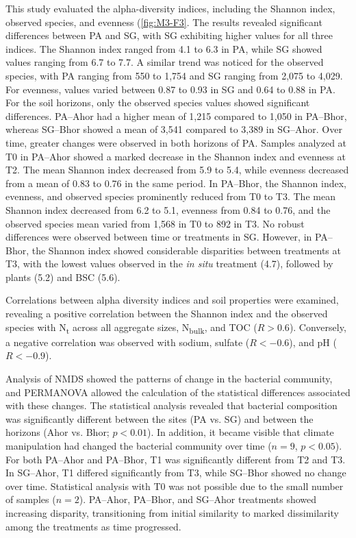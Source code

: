 This study evaluated the alpha-diversity indices, including the Shannon index, observed species, and evenness (\ref{fig:M3-F3}. The results revealed significant differences between PA and SG, with SG exhibiting higher values for all three indices. The Shannon index ranged from 4.1 to 6.3 in PA, while SG showed values ranging from 6.7 to 7.7. A similar trend was noticed for the observed species, with PA ranging from 550 to 1,754 and SG ranging from 2,075 to 4,029. For evenness, values varied between 0.87 to 0.93 in SG and 0.64 to 0.88 in PA. For the soil horizons, only the observed species values showed significant differences. PA--Ahor had a higher mean of 1,215 compared to 1,050 in PA--Bhor, whereas SG--Bhor showed a mean of 3,541 compared to 3,389 in SG--Ahor. Over time, greater changes were observed in both horizons of PA. Samples analyzed at T0 in PA--Ahor showed a marked decrease in the Shannon index and evenness at T2. The mean Shannon index decreased from 5.9 to 5.4, while evenness decreased from a mean of 0.83 to 0.76 in the same period. In PA--Bhor, the Shannon index, evenness, and observed species prominently reduced from T0 to T3. The mean Shannon index decreased from 6.2 to 5.1, evenness from 0.84 to 0.76, and the observed species mean varied from 1,568 in T0 to 892 in T3. No robust differences were observed between time or treatments in SG. However, in PA--Bhor, the Shannon index showed considerable disparities between treatments at T3, with the lowest values observed in the \textit{in situ} treatment (4.7), followed by plants (5.2) and BSC (5.6).

Correlations between alpha diversity indices and soil properties were examined, revealing a positive correlation between the Shannon index and the observed species with N\textsubscript{t} across all aggregate sizes, N\textsubscript{bulk}, and TOC (\(R > 0.6\)). Conversely, a negative correlation was observed with sodium, sulfate (\(R < -0.6\)), and pH (\(R < -0.9\)).

Analysis of NMDS showed the patterns of change in the bacterial community, and PERMANOVA allowed the calculation of the statistical differences associated with these changes. The statistical analysis revealed that bacterial composition was significantly different between the sites (PA vs. SG) and between the horizons (Ahor vs. Bhor; \(p < 0.01\)). In addition, it became visible that climate manipulation had changed the bacterial community over time (\(n=9\), \(p < 0.05\)). For both PA--Ahor and PA--Bhor, T1 was significantly different from T2 and T3. In SG--Ahor, T1 differed significantly from T3, while SG--Bhor showed no change over time. Statistical analysis with T0 was not possible due to the small number of samples (\(n=2\)). PA--Ahor, PA--Bhor, and SG--Ahor treatments showed increasing disparity, transitioning from initial similarity to marked dissimilarity among the treatments as time progressed.

